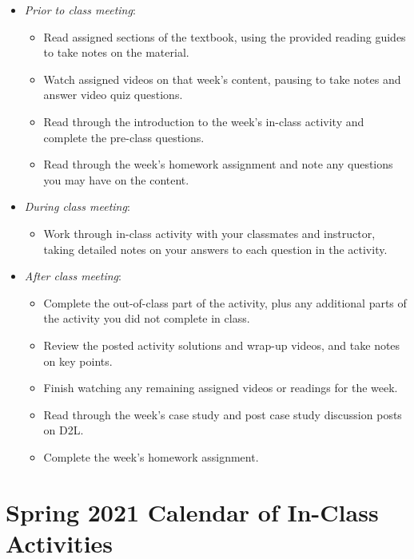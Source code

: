 \documentclass[
]{report}
\providecommand{\tightlist}{%
  \setlength{\itemsep}{0pt}\setlength{\parskip}{0pt}}
\begin{document}
\begin{itemize}
\tightlist
\item
  \emph{Prior to class meeting}:

  \begin{itemize}
  \tightlist
  \item
    Read assigned sections of the textbook, using the provided reading guides to take notes on the material.
  \item
    Watch assigned videos on that week's content, pausing to take notes and answer video quiz questions.
  \item
    Read through the introduction to the week's in-class activity and complete the pre-class questions.
  \item
    Read through the week's homework assignment and note any questions you may have on the content.
  \end{itemize}
\item
  \emph{During class meeting}:

  \begin{itemize}
  \tightlist
  \item
    Work through in-class activity with your classmates and instructor, taking detailed notes on your answers to each question in the activity.
  \end{itemize}
\item
  \emph{After class meeting}:

  \begin{itemize}
  \tightlist
  \item
    Complete the out-of-class part of the activity, plus any additional parts of the activity you did not complete in class.
  \item
    Review the posted activity solutions and wrap-up videos, and take notes on key points.
  \item
    Finish watching any remaining assigned videos or readings for the week.
  \item
    Read through the week's case study and post case study discussion posts on D2L.
  \item
    Complete the week's homework assignment.
  \end{itemize}
\end{itemize}

\hypertarget{spring-2021-calendar-of-in-class-activities}{%
\chapter*{Spring 2021 Calendar of In-Class Activities}\label{spring-2021-calendar-of-in-class-activities}}
\end{document}
